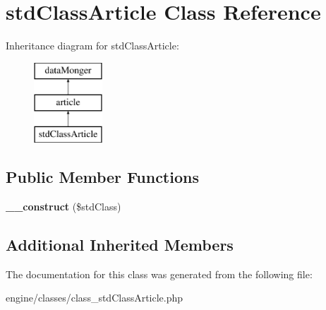\hypertarget{classstdClassArticle}{\section{std\-Class\-Article Class Reference}
\label{classstdClassArticle}
}
Inheritance diagram for std\-Class\-Article\-:\begin{figure}[H]
\begin{center}
\leavevmode
\includegraphics[height=3.000000cm]{classstdClassArticle}
\end{center}
\end{figure}
\subsection*{Public Member Functions}
\begin{DoxyCompactItemize}
\item 
\hypertarget{classstdClassArticle_aa8cf609eced5a90e21928f3cdc230ac3}{{\bfseries \-\_\-\-\_\-construct} (\$std\-Class)}\label{classstdClassArticle_aa8cf609eced5a90e21928f3cdc230ac3}

\end{DoxyCompactItemize}
\subsection*{Additional Inherited Members}


The documentation for this class was generated from the following file\-:\begin{DoxyCompactItemize}
\item 
engine/classes/class\-\_\-std\-Class\-Article.\-php\end{DoxyCompactItemize}
